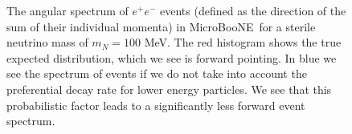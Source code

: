 \documentclass[11pt, a4paper]{article}
\def\muboone{MicroBooNE}
\def\ster{\ensuremath N}
\begin{document}
\begin{figure}[t]
%
\center
%
\Large

\resizebox{0.8\columnwidth}{!}{}
%
\caption{\label{fig:spectrum_ee_angular} The angular spectrum of $e^+e^-$ events (defined as the direction of the sum of their individual momenta) in \muboone\ for a sterile neutrino mass of $m_N = 100$ MeV. The red histogram shows the true expected distribution, which we see is forward pointing. In blue we see the spectrum of events if we do not take into account the preferential decay rate for lower energy particles. We see that this probabilistic factor leads to a 
significantly less forward event spectrum.}
%
\end{figure}


% 
%
%
\end{document}
